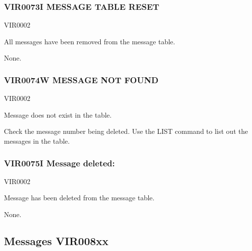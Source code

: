 \documentclass[letterpaper,10pt,english]{sphinxmanual}
\begin{document}
\subsubsection{VIR0073I MESSAGE TABLE RESET}
\label{\detokenize{messages:vir0073i-message-table-reset}}\begin{description}
\sphinxAtStartPar
VIR0002

\sphinxAtStartPar
All messages have been removed from the message table.

\sphinxAtStartPar
None.

\end{description}


\subsubsection{VIR0074W MESSAGE NOT FOUND}
\label{\detokenize{messages:vir0074w-message-not-found}}\begin{description}
\sphinxAtStartPar
VIR0002

\sphinxAtStartPar
Message does not exist in the table.

\sphinxAtStartPar
Check the message number being deleted. Use the LIST command to list out the messages in the table.

\end{description}


\subsubsection{VIR0075I Message deleted: }
\label{\detokenize{messages:vir0075i-message-deleted-messageid}}\begin{description}
\sphinxAtStartPar
VIR0002

\sphinxAtStartPar
Message  has been deleted from the message table.

\sphinxAtStartPar
None.

\end{description}


\subsection{Messages VIR008xx}
\label{\detokenize{messages:messages-vir008xx}}
\end{document}
